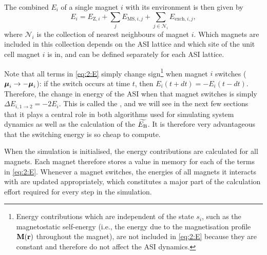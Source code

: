 The combined  $E_i$ of a single magnet $i$ with its environment is then given by
\begin{equation}
	\label{eq:2:E}
	E_i = E_{\mathrm{Z},i} + \sum_j E_{\mathrm{MS},i,j} + \sum_{j \in \mathcal{N}_i} E_{\mathrm{exch},i,j} \mathrm{,}
\end{equation}
where $\mathcal{N}_i$ is the collection of nearest neighbours of magnet $i$.
Which magnets are included in this collection depends on the ASI lattice and which site of the unit cell magnet $i$ is in, and can be defined separately for each ASI lattice. \\\par
Note that all terms in \cref{eq:2:E} simply change sign\footnote{
	Energy contributions which are independent of the state $s_i$, such as the magnetostatic self-energy (i.e., the energy due to the magnetisation profile $\boldsymbol{\mathbf{M}}(\boldsymbol{\mathbf{r}})$ throughout the magnet), are not included in \cref{eq:2:E} because they are constant and therefore do not affect the ASI dynamics.
} when magnet $i$ switches ($\boldsymbol{\mathbf{\mu}}_i \rightarrow -\boldsymbol{\mathbf{\mu}}_i$): if the switch occurs at time $t$, then $E_i(t + dt) = -E_i(t - dt)$.
Therefore, the change in energy of the ASI when that magnet switches is simply $\Delta E_{i,1\rightarrow2} = -2 E_i$.
This is called the , and we will see in the next few sections that it plays a central role in both algorithms used for simulating system dynamics as well as the calculation of the  $\widetilde{E_\mathrm{B}}$.
It is therefore very advantageous that the switching energy is so cheap to compute. \\\par
When the simulation is initialised, the energy contributions are calculated for all magnets.
Each magnet therefore stores a value in memory for each of the terms in \cref{eq:2:E}.
Whenever a magnet switches, the energies of all magnets it interacts with are updated appropriately, which constitutes a major part of the calculation effort required for every step in the simulation.

